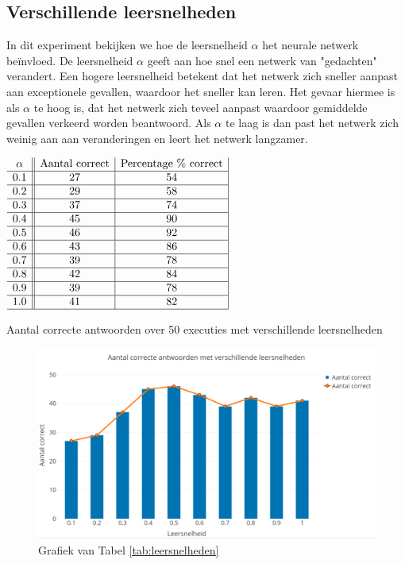 \subsection{Verschillende leersnelheden}
In dit experiment bekijken we hoe de leersnelheid $\alpha$ het neurale netwerk be\"invloed. De leersnelheid $\alpha$ geeft aan hoe snel een netwerk van "gedachten" verandert. Een hogere leersnelheid betekent dat het netwerk zich sneller aanpast aan exceptionele gevallen, waardoor het sneller kan leren. Het gevaar hiermee is als $\alpha$ te hoog is, dat het netwerk zich teveel aanpast waardoor gemiddelde gevallen verkeerd worden beantwoord. Als $\alpha$ te laag is dan past het netwerk zich weinig aan aan veranderingen en leert het netwerk langzamer.

\begin{table}[ht]
    \centering
      $\begin{array}{c||c|c |}
        \alpha & \text{Aantal correct} & \text{Percentage \% correct} \\ \hline
        0.1 & 27 & 54 \\ \hline
        0.2 & 29 & 58 \\ \hline
        0.3 & 37 & 74 \\ \hline
        0.4 & 45 & 90 \\ \hline
        0.5 & 46 & 92 \\ \hline
        0.6 & 43 & 86 \\ \hline
        0.7 & 39 & 78 \\ \hline
        0.8 & 42 & 84 \\ \hline
        0.9 & 39 & 78 \\ \hline
        1.0 & 41 & 82 \\ \hline
      \end{array}$
    \caption{Aantal correcte antwoorden over 50 executies met verschillende leersnelheden}
    \label{tab:leersnelheden}
\end{table}

\begin{figure}[ht]
    \centering
    \includegraphics[scale=0.3]{graphs/leersnelheden.png}
    \caption{Grafiek van Tabel \ref{tab:leersnelheden}}
    \label{fig:leersneheden}
\end{figure}